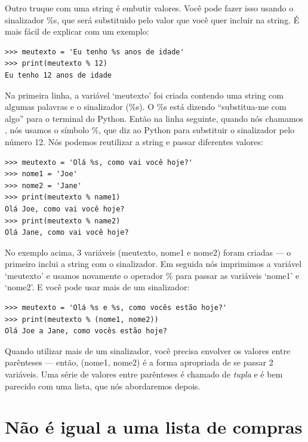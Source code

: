Outro truque com uma string é embutir valores. Você pode fazer isso usando o sinalizador \%s, que será substituido pelo valor que você quer incluir na string. É mais fácil de explicar com um exemplo:

\begin{listing}
\begin{verbatim}
>>> meutexto = 'Eu tenho %s anos de idade'
>>> print(meutexto % 12)
Eu tenho 12 anos de idade
\end{verbatim}
\end{listing}

Na primeira linha, a variável `meutexto' foi criada contendo uma string com algumas palavras e o sinalizador (\%s). O \%s está dizendo ``substitua-me com algo'' para o terminal do Python. Então na linha seguinte, quando nós chamamos , nós usamos o símbolo \%, que diz ao Python para substituir o sinalizador pelo número 12. Nós podemos reutilizar a string e passar diferentes valores:

\begin{listing}
\begin{verbatim}
>>> meutexto = 'Olá %s, como vai você hoje?'
>>> nome1 = 'Joe'
>>> nome2 = 'Jane'
>>> print(meutexto % name1)
Olá Joe, como vai você hoje?
>>> print(meutexto % name2)
Olá Jane, como vai você hoje?
\end{verbatim}
\end{listing}

No exemplo acima, 3 variáveis (meutexto, nome1 e nome2) foram criadas --- o primeiro inclui a string com o sinalizador. Em seguida nós imprimimos a variável `meutexto' e usamos novamente o operador \% para passar as variáveis `nome1' e `nome2'. E você pode usar mais de um sinalizador:

\begin{listing}
\begin{verbatim}
>>> meutexto = 'Olá %s e %s, como vocês estão hoje?'
>>> print(meutexto % (nome1, nome2))
Olá Joe a Jane, como vocês estão hoje?
\end{verbatim}
\end{listing}

Quando utilizar mais de um sinalizador, você precisa envolver os valores entre parênteses --- então, (nome1, nome2) é a forma apropriada de se passar 2 variáveis. Uma série de valores entre parênteses é chamado de \emph{tupla} e é bem parecido com uma lista, que nós abordaremos depois.

\section{Não é igual a uma lista de compras}

